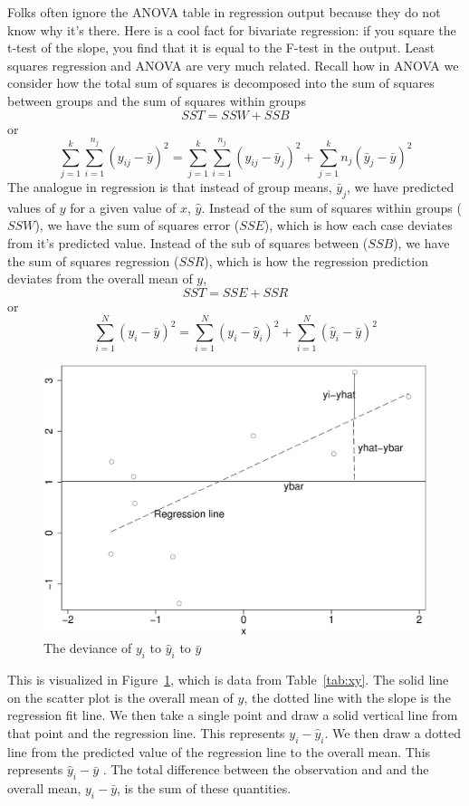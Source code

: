 Folks often ignore the ANOVA table in regression output because they do not know why it's there. Here is a cool fact for bivariate regression: if you square the t-test of the slope, you find that it is equal to the F-test in the output. Least squares regression and ANOVA are very much related. Recall how in ANOVA we consider how the total sum of squares is decomposed into the sum of squares between groups and the sum of squares within groups
\begin{equation}
SST=SSW+SSB
\end{equation}
or
\begin{equation}
\sum_{j=1}^k\sum_{i=1}^{n_j}\left(y_{ij}-\bar{y}\right)^2=\sum_{j=1}^k\sum_{i=1}^{n_j}\left(y_{ij}-\bar{y}_j\right)^2+\sum_{j=1}^kn_j\left(\bar{y}_j-\bar{y}\right)^2
\end{equation}
The analogue in regression is that instead of group means, $\bar{y}_j$, we have predicted values of $y$ for a given value of $x$, $\hat{y}$. Instead of the sum of squares within groups ($SSW$), we have the sum of squares error ($SSE$), which is how each case deviates from it's predicted value. Instead of the sub of squares between ($SSB$), we have the sum of squares regression ($SSR$), which is how the regression prediction deviates from the overall mean of $y$,
\begin{equation}
SST=SSE+SSR
\end{equation}
or
\begin{equation}
\sum_{i=1}^{N}\left(y_{i}-\bar{y}\right)^2=\sum_{i=1}^{N}\left(y_{i}-\hat{y}_i\right)^2+\sum_{i=1}^N\left(\hat{y}_i-\bar{y}\right)^2
\end{equation}
\begin{figure}
   \centering
   \includegraphics[angle=0,
           width=.75\textwidth]{anova.eps}
   \caption{The deviance of $y_i$ to $\hat{y}_i$ to $\bar{y}$}
  \label{fig:anova}
\end{figure}
This is visualized in Figure~\ref{fig:anova}, which is data from Table~\ref{tab:xy}. The solid line on the scatter plot is the overall mean of $y$, the dotted line with the slope is the regression fit line. We then take a single point and draw a solid vertical line from that point and the regression line. This represents $y_i-\hat{y}_i$. We then draw a dotted line from the predicted value of the regression line to the overall mean. This represents $\hat{y}_i-\bar{y}$ . The total difference between the observation and and the overall mean, $y_i-\bar{y}$, is the sum of these quantities.

